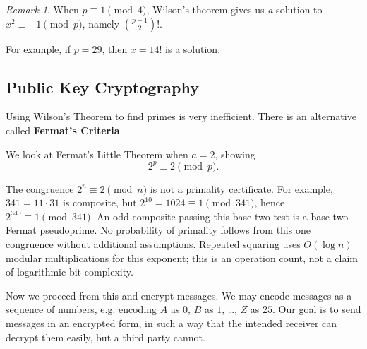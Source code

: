 \documentclass{article}
\theoremstyle{definition}
\theoremstyle{remark}
\newtheorem{remark}[theorem]{Remark}
\newcommand{\pqty}[1]{\left(#1\right)}
\begin{document}
\begin{remark}
    When \(p \equiv 1 \pmod{4}\), Wilson's theorem gives us \emph{a} solution to \(x^2 \equiv -1 \pmod{p}\), namely \(\pqty{\frac{p - 1}{2}}!\).

    For example, if \(p = 29\), then \(x = 14!\) is a solution.
\end{remark}

\subsection{Public Key Cryptography}
\label{sec:public-key-cryptography}

Using Wilson's Theorem to find primes is very inefficient. There is an alternative called \textbf{Fermat's Criteria}.

We look at Fermat's Little Theorem when \(a = 2\), showing
\[
    2^p \equiv 2 \pmod{p}.
\]

The congruence $2^n\equiv2\pmod n$ is not a primality certificate. For example, $341=11\cdot31$ is composite, but $2^{10}=1024\equiv1\pmod{341}$, hence $2^{340}\equiv1\pmod{341}$. An odd composite passing this base-two test is a base-two Fermat pseudoprime. No probability of primality follows from this one congruence without additional assumptions. Repeated squaring uses $O(\log n)$ modular multiplications for this exponent; this is an operation count, not a claim of logarithmic bit complexity.

Now we proceed from this and encrypt messages. We may encode messages as a sequence of numbers, e.g. encoding \(A\) as \(0\), \(B\) as \(1\), \dots, \(Z\) as \(25\). Our goal is to send messages in an encrypted form, in such a way that the intended receiver can decrypt them easily, but a third party cannot.
\end{document}
